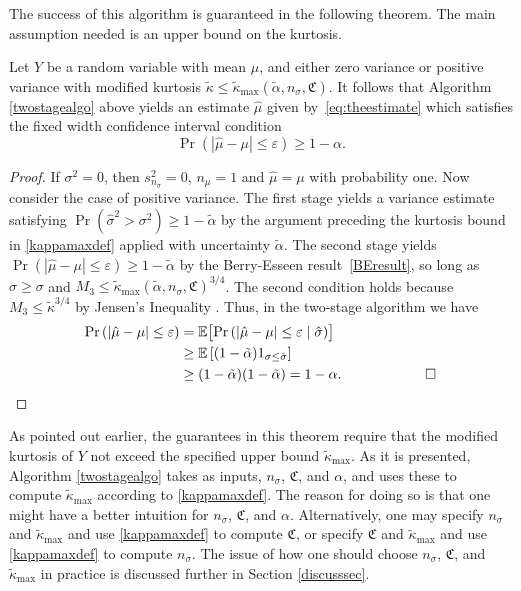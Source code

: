 \documentclass[graybox]{svmult}
\newcommand{\fudge}{\mathfrak{C}}
\newcommand\e{\mathbb{E}}
\newcommand{\Prob}{\Pr}
\newcommand{\abs}[1]{\left|#1\right|}
\newcommand{\hmu}{\hat{\mu}}
\newcommand{\hsigma}{\hat{\sigma}}
\newcommand{\tkappa}{\tilde{\kappa}}
\def\abs#1{\ensuremath{\left \lvert #1 \right \rvert}}
\begin{document}
The success of this algorithm is guaranteed in the following theorem.  The main assumption needed is an upper bound on the kurtosis.

\begin{theorem} \label{mainadaptthm} 
Let $Y$ be a random variable with mean $\mu$, and either zero variance or positive variance with modified kurtosis $\tkappa \le \tilde\kappa_{\max}(\tilde\alpha,n_\sigma,\fudge)$.  It follows that Algorithm \ref{twostagealgo} above yields an estimate
$\hat\mu$ given by~\eqref{eq:theestimate} which satisfies the fixed width confidence interval condition
$$\Pr( |\hat\mu-\mu|\le\varepsilon)\ge 1-\alpha.$$
\end{theorem}
\begin{proof}
\smartqed  
If $\sigma^2=0$, then $s_{n_\sigma}^2=0$, $n_\mu=1$ and $\hmu=\mu$ with probability one.  Now consider the case of positive variance.
The first stage yields a variance estimate satisfying
$
\Pr( \hsigma^2 >\sigma^2)\ge 1-\tilde\alpha
$
by the argument preceding the kurtosis bound in \eqref{kappamaxdef} applied with uncertainty $\tilde\alpha$.
The second stage yields
$\Pr( |\hat\mu-\mu|\le\varepsilon)\ge 1-\tilde\alpha$
by the Berry-Esseen result~\eqref{BEresult},
so long as $\hat\sigma\ge\sigma$
and $M_3\le \tilde\kappa_{\max}(\tilde\alpha,n_\sigma,\fudge)^{3/4}$.
The second condition holds because $M_3 \le \tkappa^{3/4}$ by Jensen's Inequality \citep[8.4.b]{LinBai10a}.
Thus, in the two-stage algorithm we have
\begin{align*}
\Prob\left(\abs{\hmu-\mu} \le \varepsilon \right) &
= \e\bigl[\Prob\left(\abs{\hmu-\mu} \le \varepsilon \mid \hsigma \right) \bigr] \\
& \ge \e\left[(1-\tilde\alpha) 1_{\sigma\le\hsigma}\right]\\
& \ge (1-\tilde\alpha) (1-\tilde\alpha) = 1-\alpha.\qquad \qquad \qed
\end{align*}
\end{proof}

\begin{remark} As pointed out earlier, the guarantees in this theorem require that the 
modified kurtosis of $Y$ not exceed the specified upper bound $\tkappa_{\max}$.  As it is presented, Algorithm \ref{twostagealgo} takes as inputs, $n_\sigma$, $\fudge$, and $\alpha$, and uses these to compute  $\tkappa_{\max}$ according to \eqref{kappamaxdef}.  The reason for doing so is that one might have a better intuition for $n_\sigma$, $\fudge$, and $\alpha$.  Alternatively, one may specify $n_\sigma$ and $\tkappa_{\max}$ and use \eqref{kappamaxdef} to compute $\fudge$, or specify $\fudge$ and $\tkappa_{\max}$ and use \eqref{kappamaxdef} to compute $n_\sigma$.  
The issue of how one should choose $n_\sigma$, $\fudge$, and $\tkappa_{\max}$ in practice is discussed further in Section \ref{discusssec}.
\end{remark}
\end{document}
